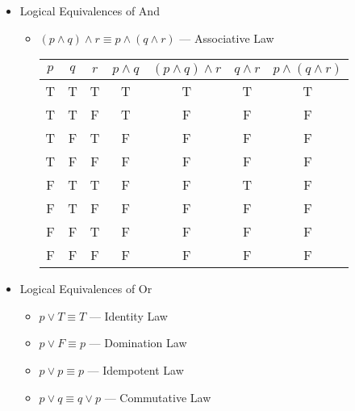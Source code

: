 \begin{itemize}

  \item Logical Equivalences of And

    \begin{itemize}

      \item $(p\wedge q) \wedge r \equiv p\wedge (q\wedge r)$ — Associative Law

        \begin{center}
          \begin{tabular}[h!]{|c|c|c|c|c|c|c|}
            \hline
            $p$ & $q$ & $r$ & $p\wedge q$ & $(p\wedge q)\wedge r$ & $q\wedge r$ & $p\wedge (q\wedge r)$\\
            \hline
            T & T & T & T & T & T & T\\
            \hline
            T & T & F & T & F & F & F\\
            \hline
            T & F & T & F & F & F & F\\
            \hline
            T & F & F & F & F & F & F\\
            \hline
            F & T & T & F & F & T & F\\
            \hline
            F & T & F & F & F & F & F\\
            \hline
            F & F & T & F & F & F & F\\
            \hline
            F & F & F & F & F & F & F\\
            \hline
          \end{tabular}
        \end{center}

    \end{itemize}

  \item Logical Equivalences of Or

    \begin{itemize}

      \item $p\vee T\equiv T$ — Identity Law

      \item $p\vee F\equiv p$ — Domination Law

      \item $p\vee p\equiv p$ — Idempotent Law

      \item $p\vee q\equiv q\vee p$ — Commutative Law


\end{itemize}
\end{itemize}
